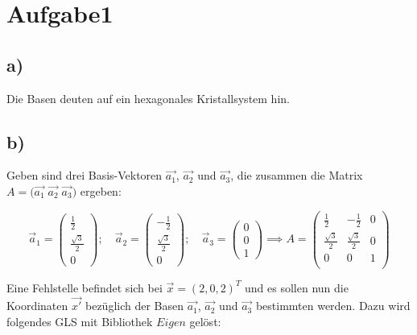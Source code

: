 



\maketitle

\section*{Aufgabe1}

\subsection*{a)}
Die Basen deuten auf ein hexagonales Kristallsystem hin.

\subsection*{b)}

Geben sind drei Basis-Vektoren $\vec{a_1}$, $\vec{a_2}$ und $\vec{a_3}$, die
zusammen die Matrix $A = \biggl(\vec{a_1}\;\vec{a_2}\;\vec{a_3}\biggr)$ ergeben:

\begin{equation*} %
  \vec{a}_{1}=\left(\begin{array}{c}
\frac{1}{2} \\
\frac{\sqrt{3}}{2} \\
0
\end{array}\right) ; \quad \vec{a}_{2}=\left(\begin{array}{c}
-\frac{1}{2} \\
\frac{\sqrt{3}}{2} \\
0
\end{array}\right) ; \quad \vec{a}_{3}=\left(\begin{array}{l}
0 \\
0 \\
1
\end{array}\right)
\implies
A =
\left(\begin{array}{rrr}
  \frac{1}{2}         & -\frac{1}{2}         & 0 \\
  \frac{\sqrt{3}}{2}  & \frac{\sqrt{3}}{2}  & 0 \\
  0                   & 0                   & 1 \\
\end{array}\right)
\end{equation*}

\noindent
Eine Fehlstelle befindet sich bei $\vec{x}=(2,0,2)^{T}$ %
und es sollen nun die Koordinaten $\vec{x'}$ bezüglich der Basen $\vec{a_1}$, $\vec{a_2}$ und $\vec{a_3}$
bestimmten werden. Dazu wird folgendes GLS mit Bibliothek $\textit{Eigen}$ gelöst:

